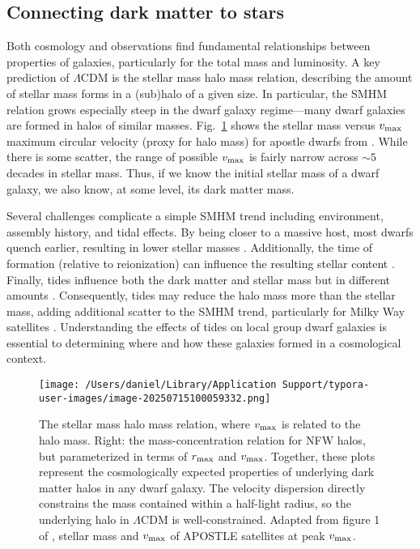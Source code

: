 \subsection{Connecting dark matter to
stars}\label{connecting-dark-matter-to-stars}

Both cosmology and observations find fundamental relationships between
properties of galaxies, particularly for the total mass and luminosity.
A key prediction of \(\Lambda\)CDM is the stellar mass halo mass
relation, describing the amount of stellar mass forms in a (sub)halo of
a given size. In particular, the SMHM relation grows especially steep in
the dwarf galaxy regime---many dwarf galaxies are formed in halos of
similar masses. Fig.~\ref{fig:smhm} shows the stellar mass versus
\(v_{\rm max}\) maximum circular velocity (proxy for halo mass) for
apostle dwarfs from \citet{fattahi+2018}. While there is some scatter,
the range of possible \(v_{\rm max}\) is fairly narrow across \(\sim 5\)
decades in stellar mass. Thus, if we know the initial stellar mass of a
dwarf galaxy, we also know, at some level, its dark matter mass.

Several challenges complicate a simple SMHM trend including environment,
assembly history, and tidal effects. By being closer to a massive host,
most dwarfs quench earlier, resulting in lower stellar masses
\citep[e.g.,][]{christensen+2024}. Additionally, the time of formation
(relative to reionization) can influence the resulting stellar content
\citep{kim+2024}. Finally, tides influence both the dark matter and
stellar mass but in different amounts \citep[e.g.,][]{PNM2008}.
Consequently, tides may reduce the halo mass more than the stellar mass,
adding additional scatter to the SMHM trend, particularly for Milky Way
satellites \citep[e.g.,][]{fattahi+2018}. Understanding the effects of
tides on local group dwarf galaxies is essential to determining where
and how these galaxies formed in a cosmological context.

\begin{figure}
\centering
\texttt{[image: /Users/daniel/Library/Application Support/typora-user-images/image-20250715100059332.png]}
\caption[Stellar-mass halo-mass relation]{The stellar mass halo mass
relation, where \(v_{\rm max}\) is related to the halo mass. Right: the
mass-concentration relation for NFW halos, but parameterized in terms of
\(r_{\rm max}\) and \(v_{\rm max}\). Together, these plots represent the
cosmologically expected properties of underlying dark matter halos in
any dwarf galaxy. The velocity dispersion directly constrains the mass
contained within a half-light radius, so the underlying halo in
\(\Lambda\)CDM is well-constrained. Adapted from figure 1 of
\citet{fattahi+2018}, stellar mass and \(v_{\rm max}\) of APOSTLE
satellites at peak \(v_{\rm max}\).}\label{fig:smhm}
\end{figure}

